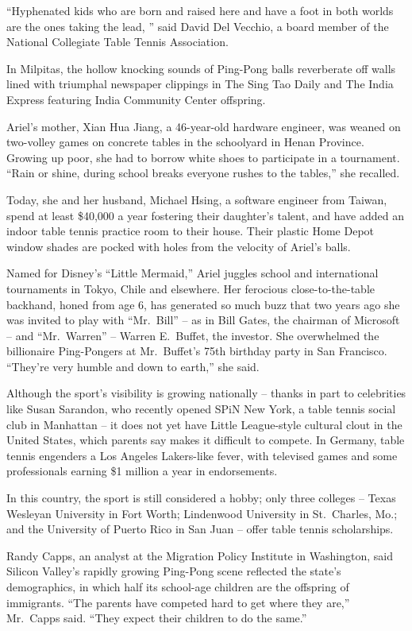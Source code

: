 ﻿\documentclass[12pt]{article}
\begin{document}
``Hyphenated kids who are born and raised here and have a foot in both worlds are the ones taking
the lead, '' said David Del Vecchio, a board member of the National Collegiate Table Tennis
Association.

In Milpitas, the hollow knocking sounds of Ping-Pong balls reverberate off walls lined with
triumphal newspaper clippings in The Sing Tao Daily and The India Express featuring India Community
Center offspring.

Ariel's mother, Xian Hua Jiang, a 46-year-old hardware engineer, was weaned on two-volley games on
concrete tables in the schoolyard in Henan Province. Growing up poor, she had to borrow white shoes
to participate in a tournament. ``Rain or shine, during school breaks everyone rushes to the
tables,'' she recalled.

Today, she and her husband, Michael Hsing, a software engineer from Taiwan, spend at least \$40,000
a year fostering their daughter's talent, and have added an indoor table tennis practice room to
their house. Their plastic Home Depot window shades are pocked with holes from the velocity of
Ariel's balls.

Named for Disney's ``Little Mermaid,'' Ariel juggles school and international tournaments in Tokyo,
Chile and elsewhere. Her ferocious close-to-the-table backhand, honed from age 6, has generated so
much buzz that two years ago she was invited to play with ``Mr.~Bill'' -- as in Bill Gates, the
chairman of Microsoft -- and ``Mr.~Warren'' -- Warren E.~Buffet, the investor. She overwhelmed the
billionaire Ping-Pongers at Mr.~Buffet's 75th birthday party in San Francisco. ``They're very humble
and down to earth,'' she said.

Although the sport's visibility is growing nationally -- thanks in part to celebrities like Susan
Sarandon, who recently opened SPiN New York, a table tennis social club in Manhattan -- it does not
yet have Little League-style cultural clout in the United States, which parents say makes it
difficult to compete. In Germany, table tennis engenders a Los Angeles Lakers-like fever, with
televised games and some professionals earning \$1 million a year in endorsements.

In this country, the sport is still considered a hobby; only three colleges -- Texas Wesleyan
University in Fort Worth; Lindenwood University in St.~Charles, Mo.; and the University of Puerto
Rico in San Juan -- offer table tennis scholarships.

Randy Capps, an analyst at the Migration Policy Institute in Washington, said Silicon Valley's
rapidly growing Ping-Pong scene reflected the state's demographics, in which half its school-age
children are the offspring of immigrants. ``The parents have competed hard to get where they are,''
Mr.~Capps said. ``They expect their children to do the same.''
\end{document}
